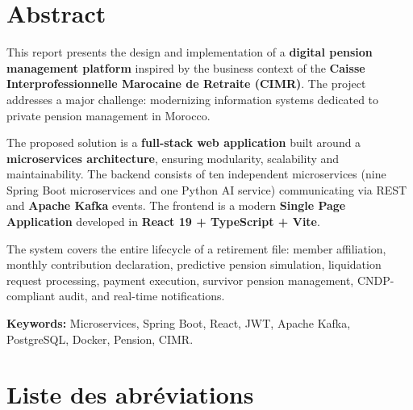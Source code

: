 \documentclass[12pt,a4paper,oneside]{report}
\begin{document}
\chapter*{Abstract}

This report presents the design and implementation of a \textbf{digital pension management platform} inspired by the business context of the \textbf{Caisse Interprofessionnelle Marocaine de Retraite (CIMR)}. The project addresses a major challenge: modernizing information systems dedicated to private pension management in Morocco.

The proposed solution is a \textbf{full-stack web application} built around a \textbf{microservices architecture}, ensuring modularity, scalability and maintainability. The backend consists of ten independent microservices (nine Spring Boot microservices and one Python AI service) communicating via REST and \textbf{Apache Kafka} events. The frontend is a modern \textbf{Single Page Application} developed in \textbf{React 19 + TypeScript + Vite}.

The system covers the entire lifecycle of a retirement file: member affiliation, monthly contribution declaration, predictive pension simulation, liquidation request processing, payment execution, survivor pension management, CNDP-compliant audit, and real-time notifications.

\textbf{Keywords:} Microservices, Spring Boot, React, JWT, Apache Kafka, PostgreSQL, Docker, Pension, CIMR.

\chapter*{Liste des abréviations}
\end{document}
